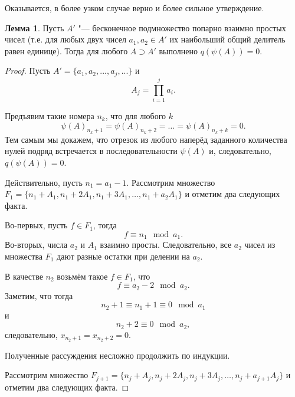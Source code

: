 \documentclass[a4paper,openbib]{article}
\theoremstyle{definition}
\newtheorem{lemma}{Лемма}[section]
\begin{document}
Оказывается, в более узком случае верно и более сильное утверждение.

\begin{lemma}
	\label{lem:ac0_primes_infinity_mutually_prime_subset}
	Пусть $A'$ "--- бесконечное подмножество попарно взаимно простых чисел
	(т.е. для любых двух чисел $a_1, a_2 \in A'$ их наибольший общий делитель равен единице).
	Тогда для любого $A \supset A' $ выполнено $q(\psi(A))=0$.
\end{lemma}
\begin{proof}
	Пусть $A' = \{ a_1, a_2, ..., a_j, ... \}$ и
	\begin{equation}
		\label{eq:ac0_primes_A_j_prod_des}
		A_j = \prod_{i=1}^j a_i
		.
	\end{equation}
	
	Предъявим такие номера $n_k$, что для любого $k$
	\begin{equation}
		\psi(A)_{n_k+1} = \psi(A)_{n_k+2} = \dots = \psi(A)_{n_k+k} = 0
		.
	\end{equation}
	Тем самым мы докажем, что отрезок из любого наперёд заданного количества нулей подряд
	встречается в последовательности $\psi(A)$ и, следовательно, $q(\psi(A)) = 0$.
	
	Действительно,
	пусть $n_1 = a_1 - 1$.
	Рассмотрим множество  $F_1 = \{ n_1 + A_1, n_1 + 2A_1, n_1 + 3A_1, \dots, n_1 + a_2A_1 \}$
	и отметим два следующих факта.
	
	Во-первых, пусть $f \in F_1$,
	тогда
	\begin{equation}
		f \equiv n_1 \mod a_1
		.
	\end{equation}
	Во-вторых, числа $a_2$ и $A_1$ взаимно просты.
	Следовательно, все $a_2$ чисел из множества $F_1$ дают разные остатки при делении на $a_2$.
	
	В качестве $n_2$ возьмём такое $f\in F_1$, что
	\begin{equation}
		f \equiv a_2 - 2 \mod a_2
		.
	\end{equation}
	Заметим, что тогда
	\begin{equation}
		n_2 + 1 \equiv n_1 + 1 \equiv 0 \mod a_1
	\end{equation}
	и
	\begin{equation}
		n_2 + 2 \equiv 0 \mod a_2
		,
	\end{equation}
	следовательно, 
	$x_{n_2 + 1} = x_{n_2 + 2} = 0$.
	
	Полученные рассуждения несложно продолжить по индукции.

	Рассмотрим множество  $F_{j+1} = \{ n_j + A_j, n_j + 2A_j, n_j + 3A_j, \dots, n_j + a_{j+1}A_j \}$
	и отметим два следующих факта.
	

\end{proof}
\end{document}
